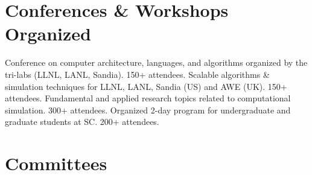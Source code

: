 


\section{Conferences \& Workshops Organized}
		{Conference on computer architecture, languages, and algorithms organized by the tri-labs (LLNL, LANL, Sandia). 150+ attendees.}
		{Scalable algorithms \& simulation techniques for LLNL, LANL, Sandia (US) and AWE (UK). 150+ attendees.}
		{%
		Fundamental and applied research topics related to %
		computational simulation. 300+ attendees.}
		{Organized 2-day program for undergraduate and graduate students at SC. 200+ attendees.}


\section{Committees}


